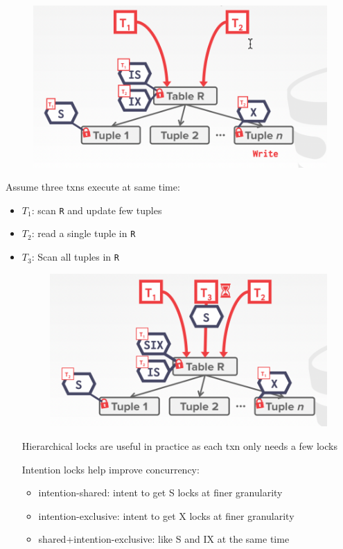 \documentclass[11pt]{article}
\begin{document}
\begin{figure}[htbp]
\centering
\includegraphics[width=.8\textwidth]{../images/15445/64.png}
\label{}
\end{figure}

Assume three txns execute at same time:
\begin{itemize}
\item \(T_1\): scan \texttt{R} and update few tuples
\item \(T_2\): read a single tuple in \texttt{R}
\item \(T_3\): Scan all tuples in \texttt{R}

\begin{figure}[htbp]
\centering
\includegraphics[width=.7\textwidth]{../images/15445/65.png}
\label{}
\end{figure}

Hierarchical locks are useful in practice as each txn only needs a few locks

Intention locks help improve concurrency:
\begin{itemize}
\item intention-shared: intent to get S locks at finer granularity
\item intention-exclusive: intent to get X locks at finer granularity
\item shared+intention-exclusive: like S and IX at the same time
\end{itemize}
\end{itemize}
\end{document}
